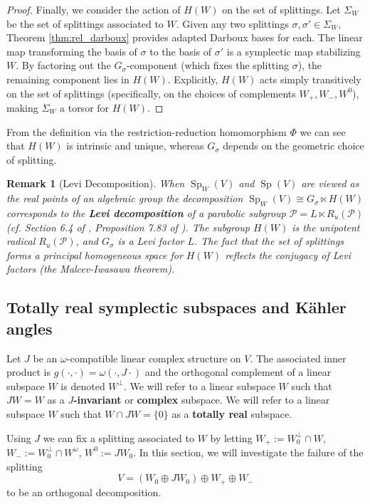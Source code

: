\documentclass[12pt, final]{article}
\def\Sp{\operatorname{Sp}}
\newtheorem{remark}[theorem]{Remark}
\begin{document}
\begin{proof}
Finally, we consider the action of $H(W)$ on the set of splittings. Let $\Sigma_W$ be the set of splittings associated to $W$. Given any two splittings $\sigma, \sigma' \in \Sigma_W$, Theorem \ref{thm:rel_darboux} provides adapted Darboux bases for each. The linear map transforming the basis of $\sigma$ to the basis of $\sigma'$ is a symplectic map stabilizing $W$. By factoring out the $G_\sigma$-component (which fixes the splitting $\sigma$), the remaining component lies in $H(W)$. Explicitly, $H(W)$ acts simply transitively on the set of splittings (specifically, on the choices of complements $W_+, W_-, W^0$), making $\Sigma_W$ a torsor for $H(W)$.
\end{proof}

From the definition via the restriction-reduction homomorphism $\Phi$ we can see that $H(W)$ is intrinsic and unique, whereas $G_\sigma$ depends on the geometric choice of splitting.

\begin{remark}[Levi Decomposition]
When $\Sp_W(V)$ and $\Sp(V)$ are viewed as the real points of an algebraic group the decomposition $\Sp_W(V) \cong G_\sigma \ltimes H(W)$ corresponds to the \textbf{Levi decomposition} of a parabolic subgroup $\mathcal{P} = L \ltimes R_u(\mathcal{P})$ (cf. Section 6.4 of \cite{OnishchikVinberg}, Proposition 7.83 of \cite{Knapp2002}). The subgroup $H(W)$ is the unipotent radical $R_u(\mathcal{P})$, and $G_\sigma$ is a Levi factor $L$. The fact that the set of splittings forms a principal homogeneous space for $H(W)$ reflects the conjugacy of Levi factors (the Malcev-Iwasawa theorem).
\end{remark}

\subsection{Totally real symplectic subspaces and K\"{a}hler angles}\label{subsec:kahler_angles}

Let $J$ be an $\omega$-compatible linear complex structure on $V$. The associated inner product is $g(\cdot, \cdot) = \omega(\cdot, J\cdot)$ and the orthogonal complement of a linear subspace $W$ is denoted $W^\perp$. We will refer to a linear subspace $W$ such that $JW = W$ as a \textbf{$J$-invariant} or \textbf{complex} subspace. We will refer to a linear subspace $W$ such that $W \cap JW = \{0\}$ as a \textbf{totally real} subspace.

Using $J$ we can fix a splitting associated to $W$ by letting $W_+:= W_0^\perp \cap W$, $W_-:= W_0^\perp \cap W^\omega$, $W^0 := JW_0$. 
In this section, we will investigate the failure of the splitting
\[ V = (W_0 \oplus JW_0)\oplus W_+ \oplus W_-\]
to be an orthogonal decomposition.
\end{document}
